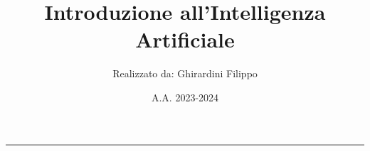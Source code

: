 \documentclass[a4paper,10pt]{article}
\title{\textbf{Introduzione all'Intelligenza Artificiale}}
\author{Realizzato da: Ghirardini Filippo}
\date{A.A. 2023-2024}
\theoremstyle{remark}
\theoremstyle{definition}
\theoremstyle{plain}
\theoremstyle{definition}
\theoremstyle{definition}
\theoremstyle{definition}
\theoremstyle{plain}
\theoremstyle{plain}
\begin{document}
	
	
	\tableofcontents
	\newpage
	\maketitle
	\begin{center}
		\vspace{-20pt}
		\rule{11cm}{.1pt} 
	\end{center}
	
	
	
	
\end{document}
